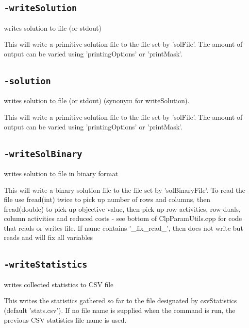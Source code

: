 \documentclass[11pt,a4paper]{article}
\begin{document}
\subsection*{\texttt{-writeSolution}}

writes solution to file (or stdout)

This will write a primitive solution file to the file set by 'solFile'. The amount of output can be varied using 'printingOptions' or 'printMask'.

\subsection*{\texttt{-solution}}

writes solution to file (or stdout) (synonym for writeSolution).

This will write a primitive solution file to the file set by 'solFile'. The amount of output can be varied using 'printingOptions' or 'printMask'.

\subsection*{\texttt{-writeSolBinary}}

writes solution to file in binary format

This will write a binary solution file to the file set by 'solBinaryFile'. To read the file use fread(int) twice to pick up number of rows and columns, then fread(double) to pick up objective value, then pick up row activities, row duals, column activities and reduced costs - see bottom of ClpParamUtils.cpp for code that reads or writes file. If name contains '\_fix\_read\_', then does not write but reads and will fix all variables

\subsection*{\texttt{-writeStatistics}}

writes collected statistics to CSV file

This writes the statistics gathered so far to the file designated by csvStatistics (default 'stats.csv'). If no file name is supplied when the command is run, the previous CSV statistics file name is used.
\end{document}
